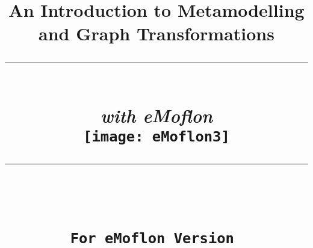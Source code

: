 \title{
\flushright
{\LARGE\bfseries An Introduction to Metamodelling\\
and Graph Transformations}
\noindent\rule[-1ex]{\textwidth}{5pt}\\[2.5ex]
\hfill\emph{\LARGE\bfseries with eMoflon}\\
\flushright
\texttt{[image: eMoflon3]}
\flushleft
\vspace{3cm}
\noindent\rule[-1ex]{0.5\textwidth}{1.5pt}\\[1.5 ex]
{\LARGE\bfseries \partTitle}\\
{\small \texttt{For eMoflon Version \versionNumber}}
}

\date{}  
\author{} 